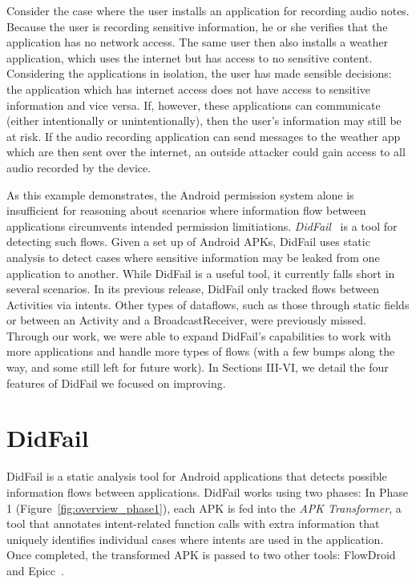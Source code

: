 Consider the case where the user installs an application for recording audio notes. Because the user is recording sensitive information, he or she verifies that the application has no network access. The same user then also installs a weather application, which uses the internet but has access to no sensitive content. Considering the applications in isolation, the user has made sensible decisions: the application which has internet access does not have access to sensitive information and vice versa. If, however, these applications can communicate (either intentionally or unintentionally), then the user's information may still be at risk. If the audio recording application can send messages to the weather app which are then sent over the internet, an outside attacker could gain access to all audio recorded by the device.

As this example demonstrates, the Android permission system alone is insufficient for reasoning about scenarios where information flow between applications circumvents intended permission limitiations. \emph{DidFail}~\cite{didfail} is a tool for detecting such flows. Given a set up of Android APKs, DidFail uses static analysis to detect cases where sensitive information may be leaked from one application to another. While DidFail is a useful tool, it currently falls short in several scenarios. In its previous release, DidFail only tracked flows between Activities via intents. Other types of dataflows, such as those through static fields or between an Activity and a BroadcastReceiver, were previously missed. Through our work, we were able to expand DidFail's capabilities to work with more applications and handle more types of flows (with a few bumps along the way, and some still left for future work). In Sections III-VI, we detail the four features of DidFail we focused on improving.


\chapter{DidFail}

DidFail is a static analysis tool for Android applications that detects possible information flows between applications. DidFail works using two phases: In Phase 1 (Figure~\ref{fig:overview_phase1}), each APK is fed into the \emph{APK Transformer}, a tool that annotates intent-related function calls with extra information that uniquely identifies individual cases where intents are used in the application. Once completed, the transformed APK is passed to two other tools: FlowDroid~\cite{flowdroid} and Epicc~\cite{epicc}.

